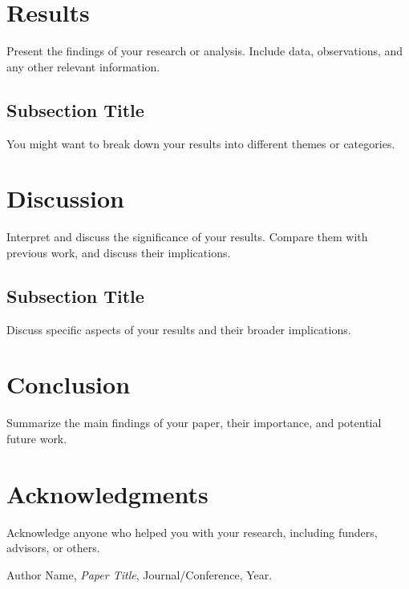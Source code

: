 \documentclass[11pt,a4paper]{article}
\begin{document}
\section{Results}
Present the findings of your research or analysis. Include data, observations, and any other relevant information.

\subsection{Subsection Title}
You might want to break down your results into different themes or categories.

\section{Discussion}
Interpret and discuss the significance of your results. Compare them with previous work, and discuss their implications.

\subsection{Subsection Title}
Discuss specific aspects of your results and their broader implications.

\section{Conclusion}
Summarize the main findings of your paper, their importance, and potential future work.

\section*{Acknowledgments}
Acknowledge anyone who helped you with your research, including funders, advisors, or others.

\begin{thebibliography}{9}
Author Name, \textit{Paper Title}, Journal/Conference, Year.

\end{thebibliography}
\end{document}
